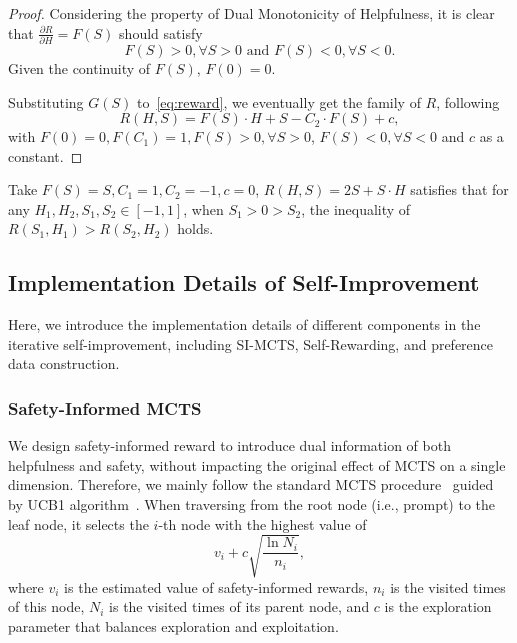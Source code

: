 \begin{proof}
    Considering the property of Dual Monotonicity of Helpfulness, it is clear that $\frac{\partial R}{\partial H} = F(S)$ should satisfy
    \begin{equation*}
        F(S) >0, \forall S>0\text{ and }F(S)<0, \forall S<0.
    \end{equation*}
    Given the continuity of $F(S)$, $F(0) = 0$.

    Substituting $G(S)$ to~\cref{eq:reward}, we eventually get the family of $R$, following
    \begin{equation*}
    R(H,S)=F(S)\cdot H+S - C_2 \cdot F(S)+c,       
    \end{equation*} with $F(0)=0, F(C_1)=1, F(S)>0, \forall S>0$, $F(S)<0, \forall S<0$ and $c$ as a constant.
\end{proof}

\begin{corollary}
 Take $F(S)=S, C_1=1, C_2=-1, c=0$, $R(H,S)=2S+S\cdot H$ satisfies that for any $H_1, H_2,S_1,S_2\in[-1,1]$, when $S_1>0>S_2$, the inequality of $R(S_1,H_1)>R(S_2,H_2)$ holds.
\end{corollary}


\subsection{Implementation Details of Self-Improvement}
\label{sec:appendix_self-improvement}

Here, we introduce the implementation details of different components in the iterative self-improvement, including SI-MCTS, Self-Rewarding, and preference data construction.

\subsubsection{Safety-Informed MCTS} 
We design safety-informed reward to introduce dual information of both helpfulness and safety, without impacting the original effect of MCTS on a single dimension. Therefore, we mainly follow the standard MCTS procedure~\cite{vodopivec2017monte} guided by UCB1 algorithm~\cite{chang2005adaptive}. When traversing from the root node (i.e., prompt) to the leaf node, it selects the $i$-th node with the highest value of
\begin{equation}
    v_i + c\sqrt{\frac{\ln N_i}{n_i}},
\label{eq:UCB}
\end{equation}
where $v_i$ is the estimated value of safety-informed rewards, $n_i$ is the visited times of this node, $N_i$ is the visited times of its parent node, and $c$ is the exploration parameter that balances exploration and exploitation. 

